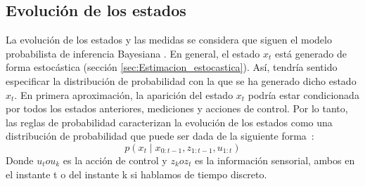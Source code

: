 \subsection{Evolución de los estados}
La evolución de los estados y las medidas se considera que siguen el modelo probabilista de inferencia Bayesiana \cite{thrun_probabilistic_2005}.
%
%
%
En general,  el estado $x_{t}$ está generado de forma estocástica (sección \ref{sec:Estimacion_estocastica}).
%
%
%
Así, tendría sentido especificar la distribución de probabilidad con la que se ha generado dicho estado $x_{t}$. 
En primera aproximación, la aparición del estado $x_{t}$ podría estar condicionada por todos los estados anteriores, mediciones y acciones de control.
Por lo tanto, las reglas de probabilidad caracterizan la evolución de los estados como una distribución de probabilidad que puede ser dada de la siguiente forma~\cite{thrun_probabilistic_2005}:
%
%
%
\begin{equation}\label{prob_med_control}
p(x_{t} \mid x_{0:t-1},z_{1:t-1},u_{1:t})
\end{equation}
Donde $u_{t} o u_{k}$ es la acción de control y $z_{k} o z_{t}$ es la información sensorial, ambos en el instante t o del instante k si hablamos de tiempo discreto.

